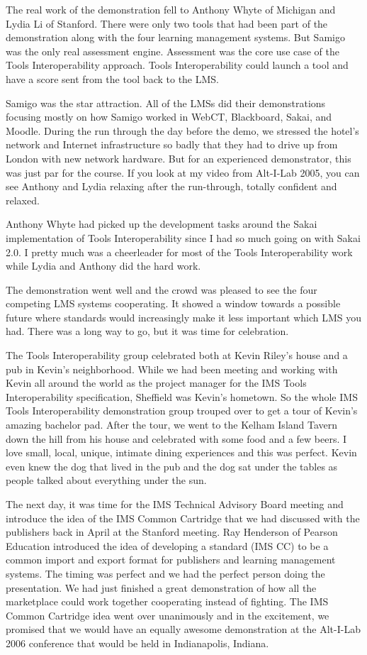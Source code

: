 \documentclass[12pt]{book}
\begin{document}
The real work of the demonstration fell to Anthony Whyte
of Michigan and Lydia Li of Stanford.   There were only two
tools that had been part of the demonstration along with the
four learning management systems.  But Samigo was the only
real assessment engine.  Assessment was the core use case
of the Tools Interoperability approach.  Tools Interoperability
could launch a tool and have a score sent from the tool back
to the LMS.

Samigo was the star attraction.  All of the LMSs
did their demonstrations focusing mostly on how
Samigo worked in WebCT, Blackboard, Sakai, and Moodle.
During the run through the day before the demo, we stressed the
hotel's network and Internet infrastructure so badly that they
had to drive up from London with new network hardware.  But for
an experienced demonstrator, this was just par for the course.
If you look at my video from Alt-I-Lab 2005, you can see Anthony
and Lydia relaxing after the run-through, totally confident
and relaxed.

Anthony Whyte had picked up the development tasks around the Sakai
implementation of Tools Interoperability since I had so much
going on with Sakai 2.0.  I pretty much was a cheerleader for
most of the Tools Interoperability work while Lydia and Anthony
did the hard work.

The demonstration went well and the crowd was pleased
to see the four competing LMS systems cooperating. It showed
a window towards a possible future where standards would
increasingly make it less important which LMS you had.  There
was a long way to go, but it was time for celebration.

The Tools Interoperability group celebrated both
at Kevin Riley's house and a pub in Kevin's
neighborhood.   While we had been meeting and working with Kevin
all around the world as the project manager for the IMS Tools
Interoperability specification, Sheffield was Kevin's hometown.  So
the whole IMS Tools Interoperability demonstration group
trouped over to get a tour of Kevin's amazing bachelor pad.
After the tour, we went to the Kelham Island Tavern
down the hill from his house
and celebrated with some food and a few beers.  I love small,
local, unique, intimate dining experiences and this was perfect.
Kevin even knew the dog that lived in the pub and the dog sat under
the tables as people talked about everything under the sun.

The next day, it was time for the IMS Technical
Advisory Board meeting and introduce the idea of the
IMS Common Cartridge that we had discussed with the publishers
back in April at the Stanford meeting.  Ray Henderson
of Pearson Education introduced the idea of developing a standard (IMS CC) 
to be a common import and
export format for publishers and learning management systems.
The timing was perfect and we had the perfect person doing the
presentation.  We had just finished a great demonstration
of how all the marketplace could work together cooperating
instead of fighting.  The IMS Common Cartridge idea
went over unanimously and in the excitement, we promised
that we would have an equally awesome demonstration at
the Alt-I-Lab 2006 conference that would be held
in Indianapolis, Indiana.
\end{document}
